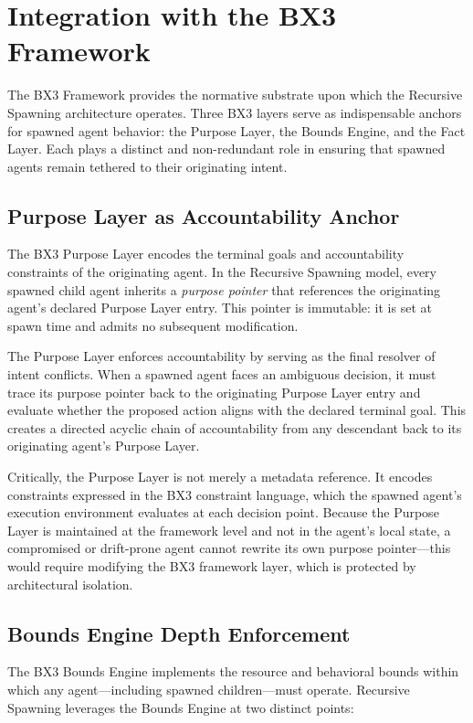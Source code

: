 \section{Integration with the BX3 Framework}

The BX3 Framework provides the normative substrate upon which the Recursive Spawning architecture operates. Three BX3 layers serve as indispensable anchors for spawned agent behavior: the Purpose Layer, the Bounds Engine, and the Fact Layer. Each plays a distinct and non-redundant role in ensuring that spawned agents remain tethered to their originating intent.

\subsection{Purpose Layer as Accountability Anchor}

The BX3 Purpose Layer encodes the terminal goals and accountability constraints of the originating agent. In the Recursive Spawning model, every spawned child agent inherits a \emph{purpose pointer} that references the originating agent's declared Purpose Layer entry. This pointer is immutable: it is set at spawn time and admits no subsequent modification.

The Purpose Layer enforces accountability by serving as the final resolver of intent conflicts. When a spawned agent faces an ambiguous decision, it must trace its purpose pointer back to the originating Purpose Layer entry and evaluate whether the proposed action aligns with the declared terminal goal. This creates a directed acyclic chain of accountability from any descendant back to its originating agent's Purpose Layer.

Critically, the Purpose Layer is not merely a metadata reference. It encodes constraints expressed in the BX3 constraint language, which the spawned agent's execution environment evaluates at each decision point. Because the Purpose Layer is maintained at the framework level and not in the agent's local state, a compromised or drift-prone agent cannot rewrite its own purpose pointer—this would require modifying the BX3 framework layer, which is protected by architectural isolation.

\subsection{Bounds Engine Depth Enforcement}

The BX3 Bounds Engine implements the resource and behavioral bounds within which any agent—including spawned children—must operate. Recursive Spawning leverages the Bounds Engine at two distinct points:

